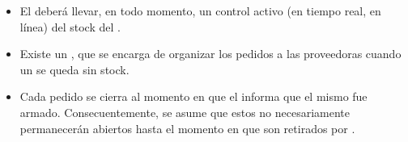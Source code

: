 \begin{itemize}
  \item El \textbf{} deberá llevar, en todo momento, un control
activo (en tiempo real, en línea) del stock del \textbf{}.

  \item Existe un \textbf{}, que se encarga de
organizar los pedidos a las proveedoras cuando un \textbf{} se
queda sin stock.

  \item Cada pedido se cierra al momento en que el \textbf{}
informa que el mismo fue armado. Consecuentemente, se asume que estos no
necesariamente permanecerán abiertos hasta el momento en que son retirados por
\textbf{}.

\end{itemize}
